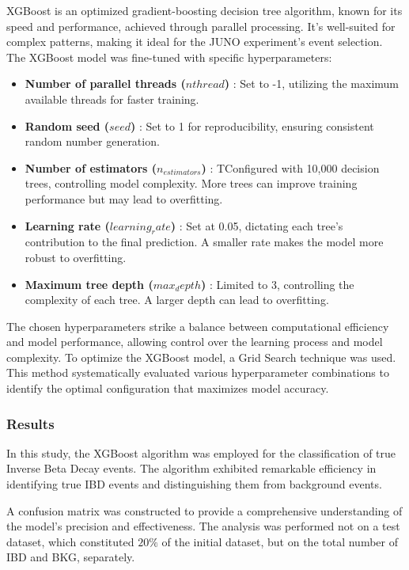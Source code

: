 
XGBoost is an optimized gradient-boosting decision tree algorithm, known for its speed and performance, achieved through parallel processing. It's well-suited for complex patterns, making it ideal for the JUNO experiment's event selection.
The XGBoost model was fine-tuned with specific hyperparameters:

\begin{itemize}
	\item  \textbf{Number of parallel threads ($nthread$)} :  Set to -1, utilizing the maximum available threads for faster training.
	\item  \textbf{Random seed ($seed$)} : Set to 1 for reproducibility, ensuring consistent random number generation.
	\item  \textbf{Number of estimators ($n_{estimators}$)} : TConfigured with 10,000 decision trees, controlling model complexity. More trees can improve training performance but may lead to overfitting.
	\item  \textbf{Learning rate ($learning_rate$)} : Set at 0.05, dictating each tree's contribution to the final prediction. A smaller rate makes the model more robust to overfitting.
	\item  \textbf{Maximum tree depth ($max_depth$)} : Limited to 3, controlling the complexity of each tree. A larger depth can lead to overfitting.
\end{itemize}
The chosen hyperparameters strike a balance between computational efficiency and model performance, allowing control over the learning process and model complexity. To optimize the XGBoost model, a Grid Search technique was used. This method systematically evaluated various hyperparameter combinations to identify the optimal configuration that maximizes model accuracy.



\subsubsection{Results}
In this study, the XGBoost algorithm was employed for the classification of true Inverse Beta Decay events. The algorithm exhibited remarkable efficiency in identifying true IBD events and distinguishing them from background events.

A confusion matrix was constructed to provide a comprehensive understanding of the model's precision and effectiveness. The analysis was performed not on a test dataset, which constituted $20\%$ of the initial dataset, but on the total number of IBD and BKG, separately.

